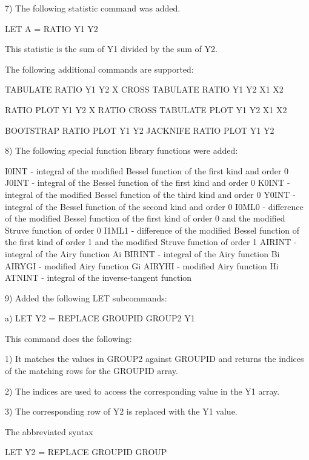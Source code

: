 { 7) The following statistic command was added.

       LET A = RATIO Y1 Y2

    This statistic is the sum of Y1 divided by the sum of Y2.

    The following additional commands are supported:

       TABULATE RATIO Y1 Y2 X
       CROSS TABULATE RATIO Y1 Y2 X1 X2

       RATIO PLOT Y1 Y2 X
       RATIO CROSS TABULATE PLOT Y1 Y2 X1 X2

       BOOTSTRAP RATIO PLOT Y1 Y2
       JACKNIFE RATIO PLOT Y1 Y2

 8) The following special function library functions were added:

       I0INT   - integral of the modified Bessel function of the
                 first kind and order 0
       J0INT   - integral of the Bessel function of the first kind
                 and order 0
       K0INT   - integral of the modified Bessel function of the
                 third kind and order 0
       Y0INT   - integral of the Bessel function of the second kind
                 and order 0
       I0ML0   - difference of the modified Bessel function of the
                 first kind of order 0 and the modified Struve function
                 of order 0
       I1ML1   - difference of the modified Bessel function of the first
                 kind of order 1 and the modified Struve function of
                 order 1
       AIRINT  - integral of the Airy function Ai
       BIRINT  - integral of the Airy function Bi
       AIRYGI  - modified Airy function Gi
       AIRYHI  - modified Airy function Hi
       ATNINT  - integral of the inverse-tangent function

 9) Added the following LET subcommands:

    a) LET Y2 = REPLACE GROUPID GROUP2 Y1

       This command does the following:
   
       1) It matches the values in GROUP2 against GROUPID and
          returns the indices of the matching rows for the GROUPID
          array.
   
       2) The indices are used to access the corresponding value
          in the Y1 array.
   
       3) The corresponding row of Y2 is replaced with the Y1
          value.
   
       The abbreviated syntax
   
           LET Y2 = REPLACE GROUPID GROUP
   
}

